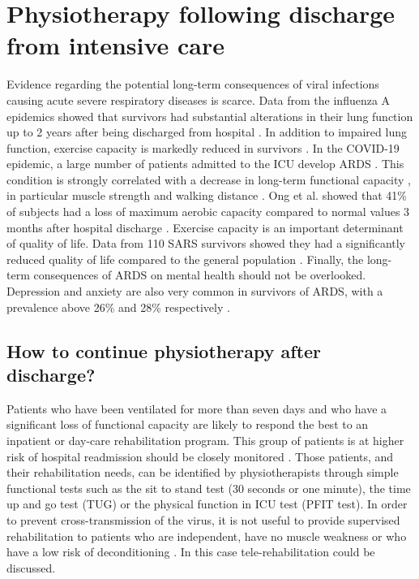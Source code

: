 \section{Physiotherapy following discharge from intensive care }
Evidence regarding the potential long-term consequences of viral infections causing acute severe respiratory diseases is scarce. Data from the influenza A epidemics showed that survivors had substantial alterations in their lung function up to 2 years after being discharged from hospital \cite{chen_long_2017,liu_pulmonary_2015}. In addition to impaired lung function, exercise capacity is markedly reduced in survivors \cite{ong_pulmonary_2004,hui_impact_2005}. In the COVID-19 epidemic, a large number of patients admitted to the ICU develop ARDS \cite{wang_clinical_2020}. This condition is strongly correlated with a decrease in long-term functional capacity \cite{herridge_one-year_2003}, in particular muscle strength and walking distance \cite{bein_long-term_2018}. Ong et al. showed that 41\% of subjects had a loss of maximum aerobic capacity compared to normal values 3 months after hospital discharge \cite{ong_pulmonary_2004}. Exercise capacity is an important determinant of quality of life. Data from 110 SARS survivors showed they had a significantly reduced quality of life compared to the general population \cite{hui_impact_2005}. Finally, the long-term consequences of ARDS on mental health should not be overlooked. Depression and anxiety are also very common in survivors of ARDS, with a prevalence above 26\% and 28\% respectively \cite{bein_long-term_2018}. 

\subsection{How to continue physiotherapy after discharge?}
Patients who have been ventilated for more than seven days and who have a significant loss of functional capacity are likely to respond the best to an inpatient or day-care rehabilitation program. This group of patients is at higher risk of hospital readmission should be closely monitored \cite{herridge_recover_2016}. Those patients, and their rehabilitation needs, can be identified by physiotherapists through simple functional tests such as the sit to stand test (30 seconds or one minute), the time up and go test (TUG) or the physical function in ICU test (PFIT test). In order to prevent cross-transmission of the virus, it is not useful to provide  supervised rehabilitation to patients who are independent, have no muscle weakness or who have a low risk of deconditioning \cite{noauthor_covid-19_2020}. In this case tele-rehabilitation could be discussed.

